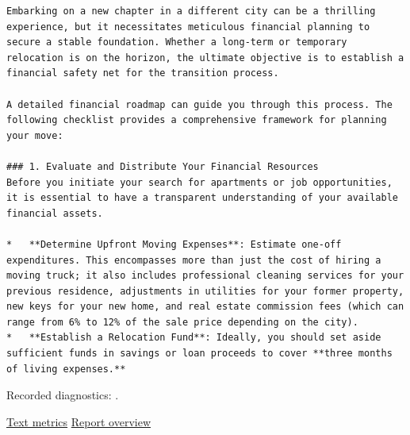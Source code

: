 \begin{Verbatim}
Embarking on a new chapter in a different city can be a thrilling experience, but it necessitates meticulous financial planning to secure a stable foundation. Whether a long-term or temporary relocation is on the horizon, the ultimate objective is to establish a financial safety net for the transition process.

A detailed financial roadmap can guide you through this process. The following checklist provides a comprehensive framework for planning your move:

### 1. Evaluate and Distribute Your Financial Resources
Before you initiate your search for apartments or job opportunities, it is essential to have a transparent understanding of your available financial assets.

*   **Determine Upfront Moving Expenses**: Estimate one-off expenditures. This encompasses more than just the cost of hiring a moving truck; it also includes professional cleaning services for your previous residence, adjustments in utilities for your former property, new keys for your new home, and real estate commission fees (which can range from 6% to 12% of the sale price depending on the city).
*   **Establish a Relocation Fund**: Ideally, you should set aside sufficient funds in savings or loan proceeds to cover **three months of living expenses.**
\end{Verbatim}

Recorded diagnostics:
\texttt{}.

\href{records/docs/watermarking/text.tex}{Text metrics} \textbar{}
\href{../docs/watermarking/README.md}{Report overview}
